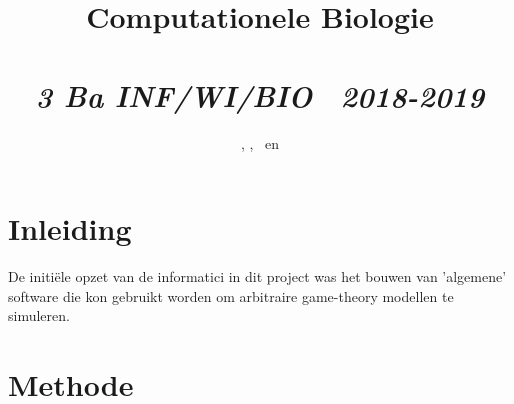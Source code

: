 \documentclass{article}
\title{\textmd{\textbf{Computationele Biologie}}\\\normalsize\vspace{0.1in}\Large{\assignmentname}\\\vspace{0.1in}\small{\textit{3 Ba INF/WI/BIO \  2018-2019}}}
\author{\studentA, \studentB, \studentC \ en \studentD}
\date{}
\begin{document}
\maketitle

\section{Inleiding}
De initiële opzet van de informatici in dit project was het bouwen van 'algemene' software die kon gebruikt worden om arbitraire game-theory modellen te simuleren.

\section{Methode}
\end{document}

